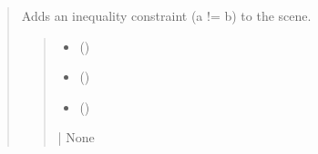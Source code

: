 \documentclass[letterpaper,10pt,english]{sphinxmanual}
\begin{document}
\begin{quote}
\begin{fulllineitems}
\begin{fulllineitems}
\end{fulllineitems}


\begin{fulllineitems}
\label{\detokenize{pygeox:pygeox.constraint.ConstraintNamespace.neq}}
\pysigstartsignatures
\pysiglinewithargsret
{}
{\sphinxparamcomma {}\sphinxparamcomma {}}
{}
\pysigstopsignatures
\sphinxAtStartPar
Adds an inequality constraint (a != b) to the scene.
\begin{quote}\begin{description}
\begin{itemize}
\item {} 
\sphinxAtStartPar
{} (\sphinxstyleliteralemphasis{\sphinxupquote{ | }}\sphinxstyleliteralemphasis{\sphinxupquote{ | }})

\item {} 
\sphinxAtStartPar
{} (\sphinxstyleliteralemphasis{\sphinxupquote{ | }}\sphinxstyleliteralemphasis{\sphinxupquote{ | }})

\item {} 
\sphinxAtStartPar
{} (\sphinxstyleliteralemphasis{\sphinxupquote{ | }})

\end{itemize}

\sphinxAtStartPar
{} | None

\end{description}\end{quote}

\end{fulllineitems}


\end{fulllineitems}




\end{quote}
\end{document}

